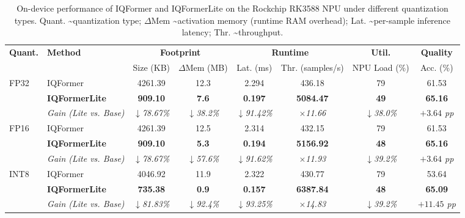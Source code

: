 \documentclass{article}
\begin{document}
	\begin{table}[htbp]
		\centering
		\caption{On-device performance of IQFormer and IQFormerLite on the Rockchip RK3588 NPU under different quantization types. Quant. \textasciitilde  quantization type; {$\Delta$Mem} \textasciitilde activation memory (runtime RAM overhead); Lat. \textasciitilde per-sample inference latency; Thr. \textasciitilde throughput.}
		\label{tab:quant_npu}
		\renewcommand{\arraystretch}{1.2}
		\begin{adjustbox}{max width=\textwidth}
			\begin{tabular}{llcccccc}
			\toprule[1.5pt]
			\multirow{2}{*}{\textbf{Quant.}} & \multirow{2}{*}{\textbf{Method}} &
			\multicolumn{2}{c}{\textbf{Footprint}} &
			\multicolumn{2}{c}{\textbf{Runtime}} &
			\textbf{Util.} & \textbf{Quality} \\
			\cmidrule(lr){3-4} \cmidrule(lr){5-6} \cmidrule(lr){7-7} \cmidrule(lr){8-8}
			& & {Size (KB)} & {$\Delta$Mem (MB)} & {Lat. (ms)} & {Thr. (samples/s)} & {NPU Load (\%)} & {Acc. (\%)} \\
			\midrule
			
			\multirow{3}{*}{FP32}
			& IQFormer & 4261.39 & 12.3 & 2.294 & 436.18 & 79 & 61.53 \\
			& \textbf{IQFormerLite} & \textbf{909.10} & \textbf{7.6} & \textbf{0.197} & \textbf{5084.47} & \textbf{49} & \textbf{65.16} \\
			& \textit{Gain (Lite vs. Base)} & {\textit{$\downarrow$78.67\%}} & {\textit{$\downarrow$38.2\%}} & {\textit{$\downarrow$91.42\%}} & {\textit{$\times$11.66}} & {\textit{$\downarrow$38.0\%}} & {\textit{$+3.64$ pp}} \\
			\midrule
			
			\multirow{3}{*}{FP16}
			& IQFormer & 4261.39 & 12.5 & 2.314 & 432.15 & 79 & 61.53 \\
			& \textbf{IQFormerLite} & \textbf{909.10} & \textbf{5.3} & \textbf{0.194} & \textbf{5156.92} & \textbf{48} & \textbf{65.16} \\
			& \textit{Gain (Lite vs. Base)} & {\textit{$\downarrow$78.67\%}} & {\textit{$\downarrow$57.6\%}} & {\textit{$\downarrow$91.62\%}} & {\textit{$\times$11.93}} & {\textit{$\downarrow$39.2\%}} & {\textit{$+3.64$ pp}} \\
			\midrule
			
			\multirow{3}{*}{INT8}
			& IQFormer & 4046.92 & 11.9 & 2.322 & 430.77 & 79 & 53.64 \\
			& \textbf{IQFormerLite} & \textbf{735.38} & \textbf{0.9} & \textbf{0.157} & \textbf{6387.84} & \textbf{48} & \textbf{65.09} \\
			& \textit{Gain (Lite vs. Base)} & {\textit{$\downarrow$81.83\%}} & {\textit{$\downarrow$92.4\%}} & {\textit{$\downarrow$93.25\%}} & {\textit{$\times$14.83}} & {\textit{$\downarrow$39.2\%}} & {\textit{$+11.45$ pp}} \\
			\bottomrule[1.5pt]
			\end{tabular}
		\end{adjustbox}
	\end{table}
	
\end{document}
